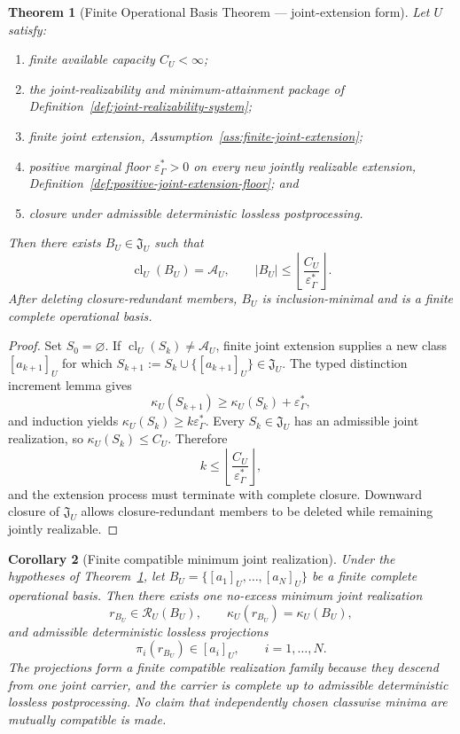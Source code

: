 \documentclass[11pt]{article}
\newtheorem{theorem}{Theorem}[section]
\newtheorem{corollary}[theorem]{Corollary}
\theoremstyle{remark}
\newcommand{\G}{\Gamma}
\newcommand{\Cost}{\kappa}
\newcommand{\floor}{\varepsilon^{\!*}_{\G}}
\begin{document}
\begin{theorem}[Finite Operational Basis Theorem --- joint-extension form]
\label{thm:finite-operational-basis}
Let $U$ satisfy:
\begin{enumerate}
\item finite available capacity $C_U<\infty$;
\item the joint-realizability and minimum-attainment package of
Definition~\ref{def:joint-realizability-system};
\item finite joint extension, Assumption~\ref{ass:finite-joint-extension};
\item positive marginal floor $\floor>0$ on every new jointly realizable
extension, Definition~\ref{def:positive-joint-extension-floor}; and
\item closure under admissible deterministic lossless postprocessing.
\end{enumerate}
Then there exists $B_U\in\mathfrak J_U$ such that
\[
  \operatorname{cl}_U(B_U)=\mathcal A_U,
  \qquad
  |B_U|\le\left\lfloor\frac{C_U}{\floor}\right\rfloor.
\]
After deleting closure-redundant members, $B_U$ is inclusion-minimal and is a
finite complete operational basis.
\end{theorem}

\begin{proof}
Set $S_0=\varnothing$.  If
$\operatorname{cl}_U(S_k)\neq\mathcal A_U$, finite joint extension supplies a
new class $[a_{k+1}]_U$ for which
$S_{k+1}:=S_k\cup\{[a_{k+1}]_U\}\in\mathfrak J_U$.  The typed distinction
increment lemma gives
\[
  \kappa_U(S_{k+1})\ge\kappa_U(S_k)+\floor,
\]
and induction yields $\kappa_U(S_k)\ge k\floor$.  Every
$S_k\in\mathfrak J_U$ has an admissible joint realization, so
$\kappa_U(S_k)\le C_U$.  Therefore
\[
  k\le\left\lfloor\frac{C_U}{\floor}\right\rfloor,
\]
and the extension process must terminate with complete closure.  Downward
closure of $\mathfrak J_U$ allows closure-redundant members to be deleted while
remaining jointly realizable.
\end{proof}

\begin{corollary}[Finite compatible minimum joint realization]
\label{cor:finite-minimal-realization}
Under the hypotheses of Theorem~\ref{thm:finite-operational-basis}, let
$B_U=\{[a_1]_U,\ldots,[a_N]_U\}$ be a finite complete operational basis.  Then
there exists one no-excess minimum joint realization
\[
  r_{B_U}\in\mathcal R_U(B_U),
  \qquad
  \Cost_U(r_{B_U})=\kappa_U(B_U),
\]
and admissible deterministic lossless projections
\[
  \pi_i(r_{B_U})\in[a_i]_U,
  \qquad i=1,\ldots,N.
\]
The projections form a finite \emph{compatible} realization family because
they descend from one joint carrier, and the carrier is complete up to
admissible deterministic lossless postprocessing.  No claim that independently
chosen classwise minima are mutually compatible is made.
\end{corollary}
\end{document}
